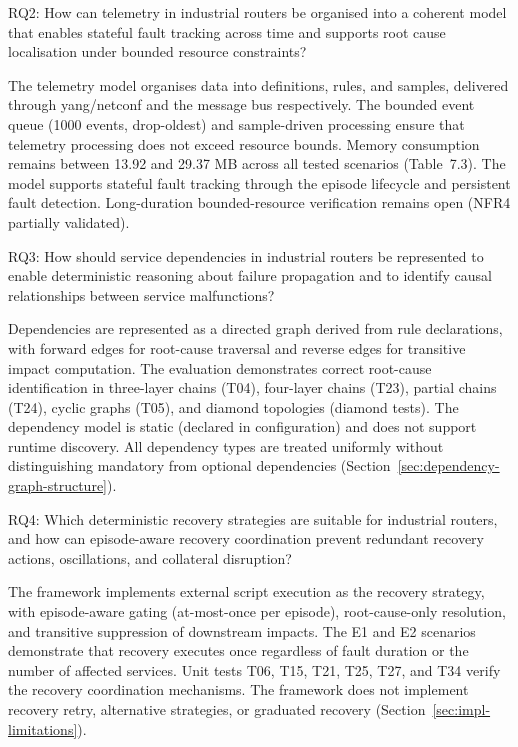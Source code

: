 RQ2: How can telemetry in industrial routers be organised into a coherent model that enables stateful fault tracking across time and supports root cause localisation under bounded resource constraints?

The telemetry model organises data into definitions, rules, and samples, delivered through \gls{yang}/\gls{netconf} and the message bus respectively. The bounded event queue (1000 events, drop-oldest) and sample-driven processing ensure that telemetry processing does not exceed resource bounds. Memory consumption remains between 13.92 and 29.37 MB across all tested scenarios (Table~7.3). The model supports stateful fault tracking through the episode lifecycle and persistent fault detection. Long-duration bounded-resource verification remains open (NFR4 partially validated).

RQ3: How should service dependencies in industrial routers be represented to enable deterministic reasoning about failure propagation and to identify causal relationships between service malfunctions?

Dependencies are represented as a directed graph derived from rule declarations, with forward edges for root-cause traversal and reverse edges for transitive impact computation. The evaluation demonstrates correct root-cause identification in three-layer chains (T04), four-layer chains (T23), partial chains (T24), cyclic graphs (T05), and diamond topologies (diamond tests). The dependency model is static (declared in configuration) and does not support runtime discovery. All dependency types are treated uniformly without distinguishing mandatory from optional dependencies (Section~\ref{sec:dependency-graph-structure}).

RQ4: Which deterministic recovery strategies are suitable for industrial routers, and how can episode-aware recovery coordination prevent redundant recovery actions, oscillations, and collateral disruption?

The framework implements external script execution as the recovery strategy, with episode-aware gating (at-most-once per episode), root-cause-only resolution, and transitive suppression of downstream impacts. The E1 and E2 scenarios demonstrate that recovery executes once regardless of fault duration or the number of affected services. Unit tests T06, T15, T21, T25, T27, and T34 verify the recovery coordination mechanisms. The framework does not implement recovery retry, alternative strategies, or graduated recovery (Section~\ref{sec:impl-limitations}).

